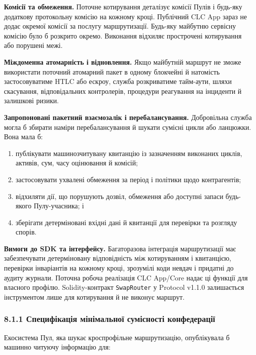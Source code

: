 \documentclass[11pt]{article}
\begin{document}
\textbf{Комісії та обмеження.} Поточне котирування деталізує комісії Пулів і будь-яку додаткову протокольну комісію на кожному кроці. Публічний CLC App зараз не додає окремої комісії за послугу маршрутизації. Будь-яку майбутню сервісну комісію було б розкрито окремо. Виконання відхиляє прострочені котирування або порушені межі.

\textbf{Міждоменна атомарність і відновлення.} Якщо майбутній маршрут не зможе використати поточний атомарний пакет в одному блокчейні й натомість застосовуватиме HTLC або ескроу, служба розкриватиме тайм-аути, шляхи скасування, відповідальних контролерів, процедури реагування на інциденти й залишкові ризики.

\textbf{Запропоновані пакетний взаємозалік і перебалансування.} Добровільна служба могла б збирати наміри перебалансування й шукати сумісні цикли або ланцюжки. Вона мала б:

\begin{enumerate}[leftmargin=*]
\item публікувати машинозчитувану квитанцію із зазначенням виконаних циклів, активів, сум, часу оцінювання й комісій;
\item застосовувати ухвалені обмеження за період і політики щодо контрагентів;
\item відхиляти дії, що порушують дозвіл, обмеження або доступні запаси будь-якого Пулу-учасника; і
\item зберігати детерміновані вхідні дані й квитанції для перевірки та розгляду спорів.
\end{enumerate}
\textbf{Вимоги до SDK та інтерфейсу.} Багаторазова інтеграція маршрутизації має забезпечувати детерміновану відповідність між котируванням і квитанцією, перевірки інваріантів на кожному кроці, зрозумілі коди невдач і придатні до аудиту журнали. Поточна робоча реалізація CLC App/Core надає ці функції для власного профілю. Solidity-контракт \texttt{SwapRouter} у Protocol v1.1.0 залишається інструментом лише для котирування й не виконує маршрут.

\subsubsection*{8.1.1 Специфікація мінімальної сумісності конфедерації}

Екосистема Пул, яка шукає кроспрофільне маршрутизацію, опублікувала б машинно читуючу інформацію для:
\end{document}

